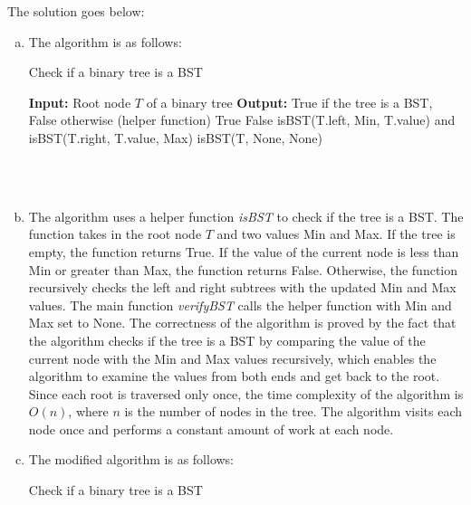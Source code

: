 \documentclass[10pt]{article}
\begin{document}
\begin{solution}
    The solution goes below:
    \begin{enumerate}[(a)]
        \item The algorithm is as follows:
        \begin{algorithm}
            \caption{Check if a binary tree is a BST} 
            \begin{algorithmic}[1]
            \Statex \textbf{Input:} Root node $T$ of a binary tree
            \Statex \textbf{Output:} True if the tree is a BST, False otherwise
             (helper function)
                    \State \Return True
                \EndIf
                    \State \Return False
                \EndIf
                \State \Return isBST(T.left, Min, T.value) and isBST(T.right, T.value, Max)
            \EndFunction
                \State \Return isBST(T, None, None)
            \EndFunction
            \end{algorithmic}
        \end{algorithm}
        \\ \\
        \item The algorithm uses a helper function \textit{isBST} to check if the tree is a BST. The function takes in the root node $T$ and two values Min and Max. If the tree is empty, the function returns True. If the value of the current node is less than Min or greater than Max, the function returns False. Otherwise, the function recursively checks the left and right subtrees with the updated Min and Max values. 
        The main function \textit{verifyBST} calls the helper function with Min and Max set to None. The correctness of the algorithm is proved by the fact that the algorithm checks if the tree is a BST by comparing the value of the current node with the Min and Max values recursively, which enables the algorithm to examine the values from both ends and get back to the root. Since each root is traversed only once, the time complexity of the algorithm is $O(n)$, where $n$ is the number of nodes in the tree. The algorithm visits each node once and performs a constant amount of work at each node.
        \item The modified algorithm is as follows:
         \begin{algorithm}
            \caption{Check if a binary tree is a BST} 

\end{algorithm}
\end{enumerate}
\end{solution}
\end{document}
